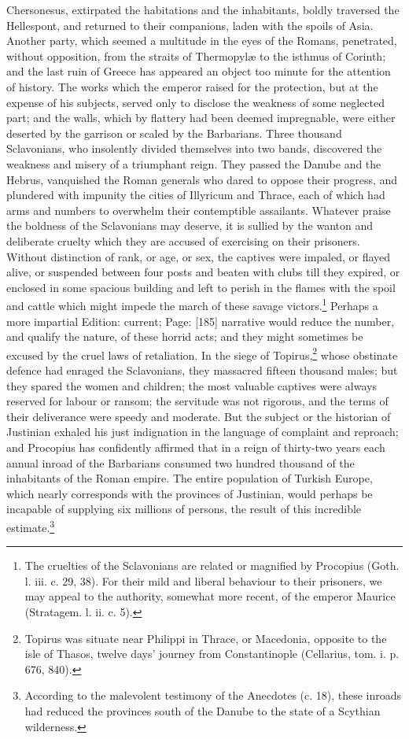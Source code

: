 Chersonesus, extirpated the habitations and the inhabitants, boldly traversed the Hellespont, and returned to their companions, laden with the spoils of Asia. Another party, which seemed a multitude in the eyes of the Romans, penetrated, without opposition, from the straits of Thermopylæ to the isthmus of Corinth; and the last ruin of Greece has appeared an object too minute for the attention of history. The works which the emperor raised for the protection, but at the expense of his subjects, served only to disclose the weakness of some neglected part; and the walls, which by flattery had been deemed impregnable, were either deserted by the garrison or scaled by the Barbarians. Three thousand Sclavonians, who insolently divided themselves into two bands, discovered the weakness and misery of a triumphant reign. They passed the Danube and the Hebrus, vanquished the Roman generals who dared to oppose their progress, and plundered with impunity the cities of Illyricum and Thrace, each of which had arms and numbers to overwhelm their contemptible assailants. Whatever praise the boldness of the Sclavonians may deserve, it is sullied by the wanton and deliberate cruelty which they are accused of exercising on their prisoners. Without distinction of rank, or age, or sex, the captives were impaled, or flayed alive, or suspended between four posts and beaten with clubs till they expired, or enclosed in some spacious building and left to perish in the flames with the spoil and cattle which might impede the march of these savage victors.\footnote{The cruelties of the Sclavonians are related or magnified by Procopius (Goth. l. iii. c. 29, 38). For their mild and liberal behaviour to their prisoners, we may appeal to the authority, somewhat more recent, of the emperor Maurice (Stratagem. l. ii. c. 5).} Perhaps a more impartial Edition: current; Page: [185] narrative would reduce the number, and qualify the nature, of these horrid acts; and they might sometimes be excused by the cruel laws of retaliation. In the siege of Topirus,\footnote{Topirus was situate near Philippi in Thrace, or Macedonia, opposite to the isle of Thasos, twelve days\texthebrew{}’ journey from Constantinople (Cellarius, tom. i. p. 676, 840).} whose obstinate defence had enraged the Sclavonians, they massacred fifteen thousand males; but they spared the women and children; the most valuable captives were always reserved for labour or ransom; the servitude was not rigorous, and the terms of their deliverance were speedy and moderate. But the subject or the historian of Justinian exhaled his just indignation in the language of complaint and reproach; and Procopius has confidently affirmed that in a reign of thirty-two years each annual inroad of the Barbarians consumed two hundred thousand of the inhabitants of the Roman empire. The entire population of Turkish Europe, which nearly corresponds with the provinces of Justinian, would perhaps be incapable of supplying six millions of persons, the result of this incredible estimate.\footnote{According to the malevolent testimony of the Anecdotes (c. 18), these inroads had reduced the provinces south of the Danube to the state of a Scythian wilderness.}

